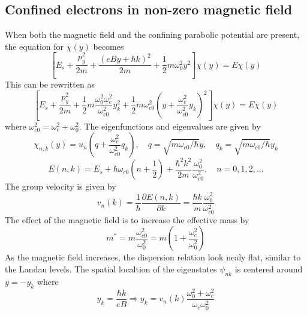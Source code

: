 \documentclass[11pt,a4paper]{book}
\theoremstyle{plain}
\theoremstyle{definition}
\theoremstyle{remark}
\begin{document}
\subsection{Confined electrons in non-zero magnetic field}
When both the magnetic field and the confining parabolic potential are present, the equation for $\chi(y)$ becomes
\begin{equation}
    \left[ E_s + \frac{p_y^2}{2 m} + \frac{(eBy + \hbar k)^2}{2 m} + \frac{1}{2} m \omega_0^2 y^2 \right]  \chi(y) = E \chi(y)
\end{equation}
This can be rewritten as
\begin{equation}
    \left[ E_s + \frac{p_y^2}{2 m} + \frac{1}{2} m \frac{\omega_0^2 \omega_c^2}{\omega_{c0}^2} y_k^2 + \frac{1}{2} m \omega_{c0}^2 \left(y + \frac{\omega_c^2}{\omega_{c0}^2} y_k\right)^2 \right]  \chi(y) = E \chi(y)
\end{equation}
where $\omega_{c0}^2 = \omega_c^2 + \omega_0^2$. The eigenfunctions and eigenvalues are given by
\begin{equation}
    \chi_{n,k}(y) = u_n\left(q + \frac{\omega_c^2}{\omega_{c0}^2} q_k\right), \quad q = \sqrt{m \omega_{c0}/\hbar} y, \quad q_k = \sqrt{m \omega_{c0}/\hbar} y_k
\end{equation}
\begin{equation}
    E(n,k) = E_s + \hbar \omega_{c0} \left(n + \frac{1}{2}\right) + \frac{\hbar^2 k^2}{2 m} \frac{\omega_0^2}{\omega_{c0}^2}, \quad n=0,1,2,...
\end{equation}
The group velocity is given by
\begin{equation}
    v_n(k) = \frac{1}{\hbar} \frac{\partial E(n,k)}{\partial k} = \frac{\hbar k}{m} \frac{\omega_0^2}{\omega_{c0}^2}
\end{equation}
The effect of the magnetic field is to increase the effective mass by
\begin{equation}
    m^* = m \frac{\omega_{c0}^2}{\omega_0^2} = m \left(1 + \frac{\omega_c^2}{\omega_0^2}\right)
\end{equation}
As the magnetic field increases, the dispersion relation look nealy flat, similar to the Landau levels. The spatial localtion of the eigenstates $\psi_{nk}$ is centered around $y = -y_k$ where
\begin{equation}
    y_k = \frac{\hbar k}{e B} \Rightarrow y_k = v_n(k)\frac{\omega_0^2 + \omega_c^2}{\omega_c\omega_0^2}
\end{equation}
\end{document}
